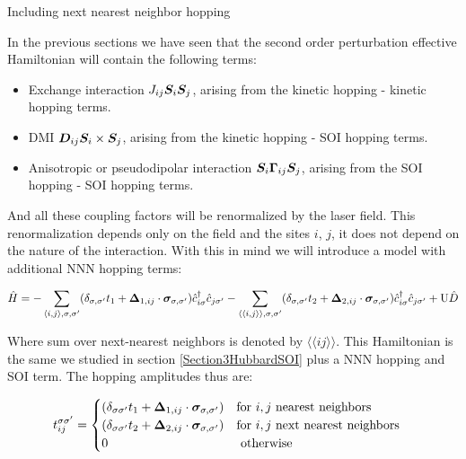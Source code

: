 \begin{section}{Including next nearest neighbor hopping}

\label{section3NNN}

In the previous sections we have seen that the second order perturbation effective Hamiltonian will contain the following terms:

\begin{itemize}
	\item Exchange interaction $J_{ij} \boldsymbol{S}_i \boldsymbol{S}_j$, arising from the kinetic hopping - kinetic hopping terms.
	\item DMI $\boldsymbol{D}_{ij} \boldsymbol{S}_i \times \boldsymbol{S}_j$, arising from the kinetic hopping - SOI hopping terms.
	\item Anisotropic or pseudodipolar interaction $\boldsymbol{S}_i \boldsymbol{\Gamma}_{ij} \boldsymbol{S}_j$, arising from the SOI hopping - SOI hopping terms.
\end{itemize}

And all these coupling factors will be renormalized by the laser field. This renormalization depends only on the field and the sites $i$, $j$, it does not depend on the nature of the interaction. With this in mind we will introduce a model with additional NNN hopping terms: 

\begin{equation}
\label{BigHam}
\hat{H} = -\sum_{\langle i,j \rangle, \sigma, \sigma'}(\delta_{\sigma, \sigma'} t_1 + \boldsymbol{\Delta}_{1,ij}\cdot \boldsymbol{\sigma}_{\sigma, \sigma'})\hat{c}_{i \sigma}^\dagger \hat{c}_{j \sigma'} - 
	\sum_{\langle \langle i,j \rangle \rangle, \sigma, \sigma'}(\delta_{\sigma, \sigma'} t_2 + \boldsymbol{\Delta}_{2,ij}\cdot \boldsymbol{\sigma}_{\sigma, \sigma'})\hat{c}_{i \sigma}^\dagger \hat{c}_{j \sigma'} + 
	\text{U}\hat{D}
\end{equation}

Where sum over next-nearest neighbors is denoted by $\langle \langle i j \rangle \rangle$. This Hamiltonian is the same we studied in section \ref{Section3HubbardSOI} plus a NNN hopping and SOI term. The hopping amplitudes thus are:

\begin{equation}
\label{BigHamHoppingAmp}
t_{ij}^{\sigma \sigma'} = \begin{cases}
	(\delta_{\sigma \sigma'}t_1+\boldsymbol{\Delta}_{1,ij}\cdot \boldsymbol{\sigma}_{\sigma, \sigma'}) & \text{for } i, j \text{ nearest neighbors} \\
	(\delta_{\sigma \sigma'}t_2+\boldsymbol{\Delta}_{2,ij}\cdot \boldsymbol{\sigma}_{\sigma, \sigma'}) & \text{for } i, j \text{ next nearest neighbors} \\
	0 & \text{ otherwise}
\end{cases} \quad
\end{equation}


\end{section}
